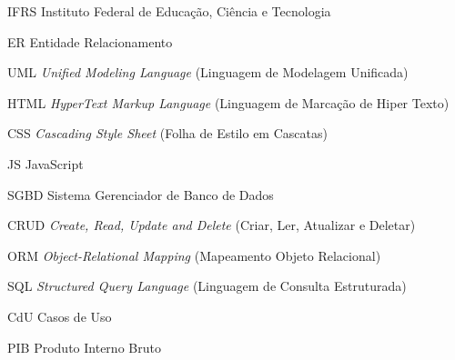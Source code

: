 %
%

\begin{siglas}
	\setlength{\baselineskip}{0.7\baselineskip}

		\item[IFRS] Instituto Federal de Educação, Ciência e Tecnologia
    \item[ER] Entidade Relacionamento
    \item[UML] \textit{Unified Modeling Language} (Linguagem de Modelagem Unificada)
    \item[HTML] \textit{HyperText Markup Language} (Linguagem de Marcação de Hiper Texto)
    \item[CSS] \textit{Cascading Style Sheet} (Folha de Estilo em Cascatas)
    \item[JS] JavaScript
		\item[SGBD] Sistema Gerenciador de Banco de Dados
		\item[CRUD] \textit{Create, Read, Update and Delete} (Criar, Ler, Atualizar e Deletar)
		\item[ORM] \textit{Object-Relational Mapping} (Mapeamento Objeto Relacional)
		\item[SQL] \textit{Structured Query Language} (Linguagem de Consulta Estruturada)
		\item[CdU] Casos de Uso
		\item[PIB] Produto Interno Bruto

\end{siglas}

